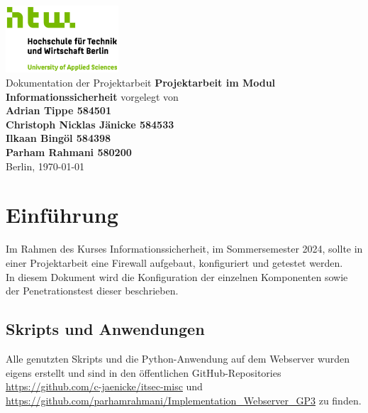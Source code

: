 \documentclass[
    a4paper,
    pagesize,
	pdftex,
    12pt,
]{scrartcl}
\begin{document}
\begin{titlepage}
    \begin{center}
        \includegraphics[height=25mm]{S04_HTW_Berlin_Logo_pos_FARBIG_RGB.jpg} \\
        \vspace{1.0cm}
        Dokumentation der Projektarbeit
        \vspace{1.5cm}   
        \textbf{Projektarbeit im Modul Informationssicherheit}
        \vspace{1.5cm}
        vorgelegt von \\
        \textbf{Adrian Tippe 584501} \\
        \textbf{Christoph Nicklas Jänicke 584533} \\
        \textbf{Ilkaan Bingöl 584398} \\
        \textbf{Parham Rahmani 580200} \\
        \vspace{1.5cm}    
        Berlin, \today\\
    \end{center}
\end{titlepage}


\thispagestyle{empty}
\tableofcontents
\newpage


\section{Einführung}
Im Rahmen  des  Kurses Informationssicherheit,  im Sommersemester 2024, sollte in einer Projektarbeit eine Firewall aufgebaut,  konfiguriert  und getestet werden. \\
In  diesem Dokument wird die Konfiguration  der  einzelnen Komponenten sowie der Penetrationstest dieser beschrieben.

\subsection{Skripts und Anwendungen}
Alle genutzten Skripts und die Python-Anwendung auf dem Webserver wurden eigens erstellt und sind in den öffentlichen GitHub-Repositories  \\
\url{https://github.com/c-jaenicke/itsec-misc} und  \url{https://github.com/parhamrahmani/Implementation_Webserver_GP3} zu finden.
\end{document}
